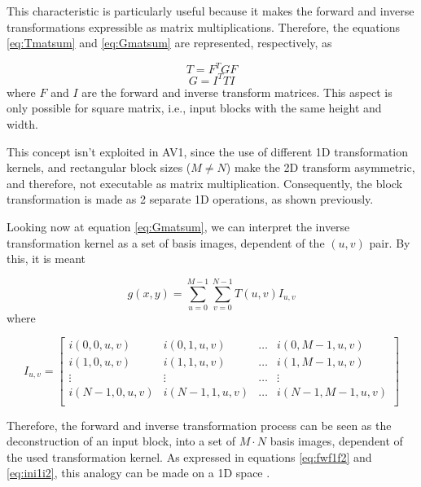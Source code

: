 This characteristic is particularly useful because it makes the forward and inverse transformations expressible as matrix multiplications. Therefore, the equations \ref{eq:Tmatsum} and \ref{eq:Gmatsum} are represented, respectively, as

\begin{equation}
    T = F^TGF 
\end{equation}
\begin{equation}
    G = I^TTI
\end{equation}
where $F$ and $I$ are the forward and inverse transform matrices. This aspect is only possible for square matrix, i.e., input blocks with the same height and width.

This concept isn't exploited in AV1, since the use of different 1D transformation kernels, and rectangular block sizes ($M \neq N$) make the 2D transform asymmetric, and therefore, not executable as matrix multiplication. Consequently, the block transformation is made as 2 separate 1D operations, as shown previously.


\textsep

Looking now at equation \ref{eq:Gmatsum}, we can interpret the inverse transformation kernel as a set of basis images, dependent of the $(u,v)$ pair. By this, it is meant 

\begin{equation}
    g(x,y) = \sum_{u=0}^{M-1}\sum_{v=0}^{N-1}T(u,v)I_{u,v}
\end{equation}
where

\begin{equation}
    I_{u,v}=\begin{bmatrix}
                i(0,0,u,v) & i(0,1,u,v) & \dots & i(0,M-1,u,v) \\
                i(1,0,u,v) & i(1,1,u,v) & \dots & i(1,M-1,u,v) \\
                \vdots     & \vdots     & \dots & \vdots       \\
                i(N-1,0,u,v) & i(N-1,1,u,v) & \dots & i(N-1,M-1,u,v) \\
            \end{bmatrix}
\end{equation}

Therefore, the forward and inverse transformation process can be seen as the deconstruction of an input block, into a set of $M \cdot N$ basis images, dependent of the used transformation kernel. As expressed in equations \ref{eq:fwf1f2} and \ref{eq:ini1i2}, this analogy can be made on a 1D space \nocite{shiImageVideoCompression2008}.

